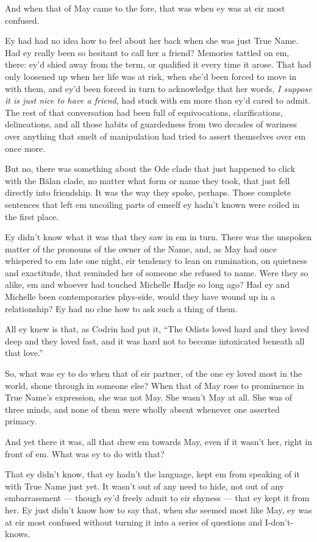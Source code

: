 And when that of May came to the fore, that was when ey was at eir most confused.

Ey had had no idea how to feel about her back when she was just True Name. Had ey really been so hesitant to call her a friend? Memories tattled on em, there: ey'd shied away from the term, or qualified it every time it arose. That had only loosened up when her life was at risk, when she'd been forced to move in with them, and ey'd been forced in turn to acknowledge that her words, \emph{I suppose it is just nice to have a friend}, had stuck with em more than ey'd cared to admit. The rest of that conversation had been full of equivocations, clarifications, delineations, and all those habits of guardedness from two decades of wariness over anything that smelt of manipulation had tried to assert themselves over em once more.

But no, there was something about the Ode clade that just happened to click with the Bălan clade, no matter what form or name they took, that just fell directly into friendship. It was the way they spoke, perhaps. Those complete sentences that left em uncoiling parts of emself ey hadn't known were coiled in the first place.

Ey didn't know what it was that they saw in em in turn. There was the unspoken matter of the pronouns of the owner of the Name, and, as May had once whispered to em late one night, eir tendency to lean on rumination, on quietness and exactitude, that reminded her of someone she refused to name. Were they so alike, em and whoever had touched Michelle Hadje so long ago? Had ey and Michelle been contemporaries phys-side, would they have wound up in a relationship? Ey had no clue how to ask such a thing of them.

All ey knew is that, as Codrin had put it, ``The Odists loved hard and they loved deep and they loved fast, and it was hard not to become intoxicated beneath all that love.''

So, what was ey to do when that of eir partner, of the one ey loved most in the world, shone through in someone else? When that of May rose to prominence in True Name's expression, she was not May. She wasn't May at all. She was of three minds, and none of them were wholly absent whenever one asserted primacy.

And yet there it was, all that drew em towards May, even if it wasn't her, right in front of em. What was ey to do with that?

That ey didn't know, that ey hadn't the language, kept em from speaking of it with True Name just yet. It wasn't out of any need to hide, not out of any embarrassment — though ey'd freely admit to eir shyness — that ey kept it from her. Ey just didn't know how to say that, when she seemed most like May, ey was at eir most confused without turning it into a series of questions and I-don't-knows.

